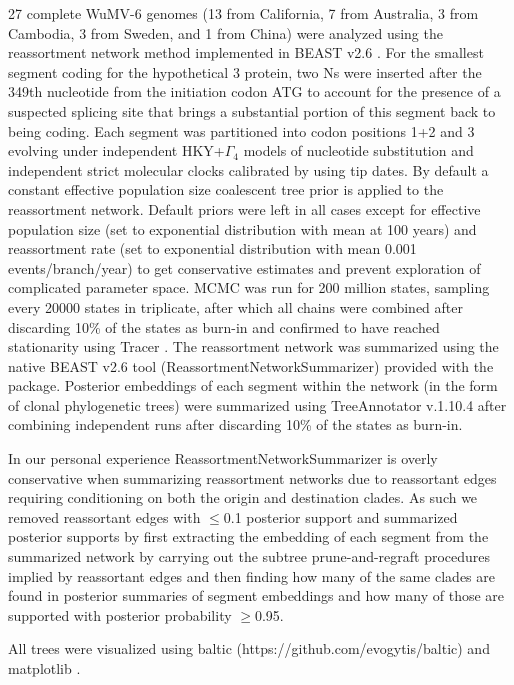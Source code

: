 \documentclass[11pt,twocolumn]{article}
\begin{document}
27 complete WuMV-6 genomes (13 from California, 7 from Australia, 3 from Cambodia, 3 from Sweden, and 1 from China) were analyzed using the reassortment network method \citep{muller_bayesian_2020} implemented in BEAST v2.6 \citep{bouckaert_beast_2019}.
For the smallest segment coding for the hypothetical 3 protein, two Ns were inserted after the 349th nucleotide from the initiation codon ATG to account for the presence of a suspected splicing site \citep{batson_single_2021} that brings a substantial portion of this segment back to being coding.
Each segment was partitioned into codon positions 1+2 and 3 evolving under independent HKY+$\Gamma_{4}$ \citep{hasegawa_dating_1985} models of nucleotide substitution and independent strict molecular clocks calibrated by using tip dates.
By default a constant effective population size coalescent tree prior is applied to the reassortment network.
Default priors were left in all cases except for effective population size (set to exponential distribution with mean at 100 years) and reassortment rate (set to exponential distribution with mean 0.001 events/branch/year) to get conservative estimates and prevent exploration of complicated parameter space.
MCMC was run for 200 million states, sampling every 20000 states in triplicate, after which all chains were combined after discarding 10\% of the states as burn-in and confirmed to have reached stationarity using Tracer \citep{rambaut_posterior_2018}.
The reassortment network was summarized using the native BEAST v2.6 tool (ReassortmentNetworkSummarizer) provided with the package.
Posterior embeddings of each segment within the network (in the form of clonal phylogenetic trees) were summarized using TreeAnnotator v.1.10.4 after combining independent runs after discarding 10\% of the states as burn-in.

In our personal experience ReassortmentNetworkSummarizer is overly conservative when summarizing reassortment networks due to reassortant edges requiring conditioning on both the origin and destination clades.
As such we removed reassortant edges with $\leq$0.1 posterior support and summarized posterior supports by first extracting the embedding of each segment from the summarized network by carrying out the subtree prune-and-regraft procedures implied by reassortant edges and then finding how many of the same clades are found in posterior summaries of segment embeddings and how many of those are supported with posterior probability $\geq$0.95.

All trees were visualized using baltic (https://github.com/evogytis/baltic) and matplotlib \citep{hunter_matplotlib_2007}.
\end{document}
